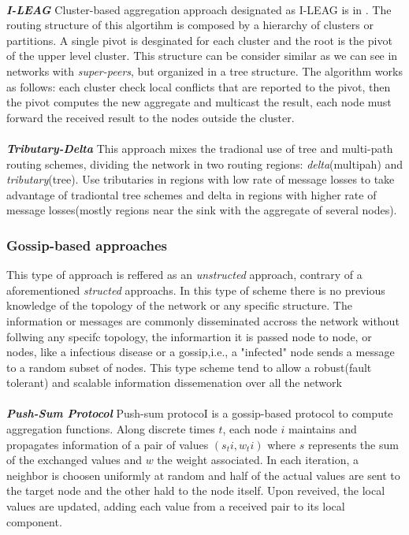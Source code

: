 \\
\textbf{\textit{I-LEAG}} Cluster-based aggregation approach designated as I-LEAG is in \cite{birk2006veracity}. The routing structure of this algortihm is composed by a hierarchy of clusters or partitions. A single pivot is desginated for each cluster and the root is the pivot of the upper level cluster. This structure can be consider similar as we can see in networks with \textit{super-peers}, but organized in a tree structure. The algorithm works as follows: each cluster check local conflicts that are reported to the pivot, then the pivot computes the new aggregate and multicast the result, each node must forward the received result to the nodes outside the cluster.\\
\\
\textbf{\textit{Tributary-Delta}} 
This approach mixes the tradional use of tree and multi-path routing schemes, dividing the network in two routing regions: \textit{delta}(multipah) and \textit{tributary}(tree). Use tributaries in regions with low rate of message losses to take advantage of tradiontal tree schemes and delta in regions with higher rate of message losses(mostly regions near the sink with the aggregate of several nodes).

\subsubsection{Gossip-based approaches}
This type of approach is reffered as an \textit{unstructed} approach, contrary of a aforementioned \textit{structed} approachs. In this type of scheme there is no previous knowledge of the topology of the network or any specific structure. The information or messages are commonly disseminated accross the network without follwing any specifc topology, the informartion it is passed node to node, or nodes, like a infectious disease or a gossip,i.e., a "infected" node sends a message to a random subset of nodes. This type scheme tend to allow a robust(fault tolerant) and scalable information dissemenation over all the network\cite{journals/corr/abs-1110-0725}\\
\\
\textbf{\textit{Push-Sum Protocol}}  Push-sum protocoI\cite{kempe2003gossip} is a gossip-based protocol to compute aggregation functions. Along discrete times $t$, each node $i$ maintains and propagates information of a pair of values $(s_ti,w_ti)$ where $s$ represents the sum of the exchanged values and $w$ the weight associated. In each iteration, a neighbor is choosen uniformly at random and half of the actual values are sent to the target node and the other hald to the node itself. Upon reveived, the local values are updated, adding each value from a received pair to its local component\cite{journals/corr/abs-1110-0725}.

